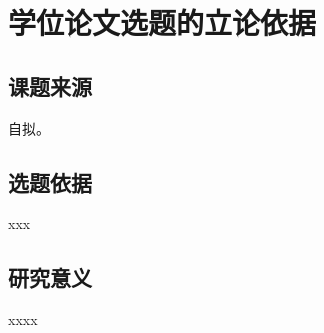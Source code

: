 



\section{学位论文选题的立论依据}


\begin{mdframed}[everyline=true]
	
\subsection{课题来源}
{\kaishu {}自拟。}


\subsection{选题依据}
xxx


\subsection{研究意义}
xxxx
\\[15 cm]
\end{mdframed}

